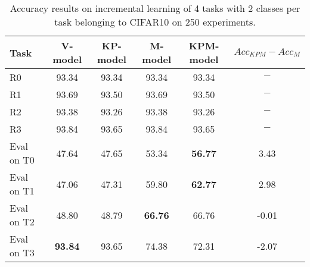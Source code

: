 \begin{table}[H]
\centering
\begin{tabular}{lccccc}
\toprule
Task  & V-model & KP-model & M-model & KPM-model & $Acc_{KPM}-Acc_{M}$ \\
\midrule
R0 & 93.34 & 93.34 & 93.34 & 93.34 & $-$ \\
R1 & 93.69 & 93.50 & 93.69 & 93.50 & $-$ \\
R2 & 93.38 & 93.26 & 93.38 & 93.26 & $-$ \\
R3 & 93.84 & 93.65 & 93.84 & 93.65 & $-$ \\

 \hline 
Eval on T0 & 47.64 & 47.65 & 53.34 & \textbf{56.77} & 3.43 \\
Eval on T1 & 47.06 & 47.31 & 59.80 & \textbf{62.77} & 2.98 \\
Eval on T2 & 48.80 & 48.79 & \textbf{66.76} & 66.76 & -0.01 \\
Eval on T3 & \textbf{93.84} & 93.65 & 74.38 & 72.31 & -2.07 \\
\bottomrule
\end{tabular}
\caption{Accuracy results on incremental learning of 4 tasks with 2 classes per task belonging to CIFAR10 on 250 experiments.}
\end{table}
